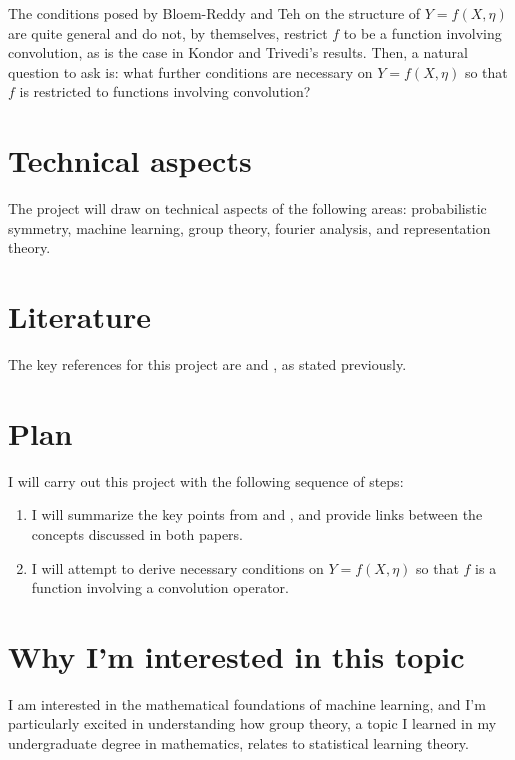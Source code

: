 \documentclass[]{STAT_547C}
\begin{document}
The conditions posed by Bloem-Reddy and Teh on the structure of $Y = f(X, \eta)$ are quite general and do not, by themselves, restrict $f$ to be a function involving convolution, as is the case in Kondor and Trivedi's results.
Then, a natural question to ask is: what further conditions are necessary on $Y = f(X, \eta)$ so that $f$ is restricted to functions involving convolution?
\section{Technical aspects}

The project will draw on technical aspects of the following areas: probabilistic symmetry, machine learning, group theory, fourier analysis, and representation theory.


\section{Literature}

The key references for this project are \cite{kondor2018generalization} and \cite{bloemreddy2019probabilistic}, as stated previously.


\section{Plan}

I will carry out this project with the following sequence of steps: 
\begin{enumerate}
  \item I will summarize the key points from \cite{bloemreddy2019probabilistic} and \cite{kondor2018generalization}, and provide links between the concepts discussed in both papers.
  \item I will attempt to derive necessary conditions on $Y = f(X, \eta)$ so that $f$ is a function involving a convolution operator.
\end{enumerate}


\section{Why I'm interested in this topic}

I am interested in the mathematical foundations of machine learning, and I'm particularly excited in understanding how group theory, a topic I learned in my undergraduate degree in mathematics, relates to statistical learning theory.


\printbibliography
\end{document}
